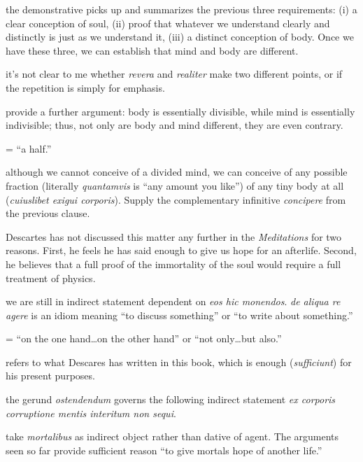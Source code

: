  the demonstrative picks up and summarizes the previous three requirements: (i) a clear conception of soul, (ii) proof that whatever we understand clearly and distinctly is just as we understand it, (iii) a distinct conception of body. Once we have these three, we can establish that mind and body are different.

 it's not clear to me whether \textit{revera} and \textit{realiter} make two different points, or if the repetition is simply for emphasis.

 provide a further argument: body is essentially divisible, while mind is essentially indivisible; thus, not only are body and mind different, they are even contrary.

 = ``a half.''

 although we cannot conceive of a divided mind, we can conceive of any possible fraction (literally \textit{quantamvis} is ``any amount you like'') of any tiny body at all (\textit{cuiuslibet exigui corporis}). Supply the complementary infinitive \textit{concipere} from the previous clause.

 Descartes has not discussed this matter any further in the \textit{Meditations} for two reasons. First, he feels he has said enough to give us hope for an afterlife. Second, he believes that a full proof of the immortality of the soul would require a full treatment of physics.

 we are still in indirect statement dependent on \textit{eos hic monendos}. \textit{de aliqua re agere} is an idiom meaning ``to discuss something'' or ``to write about something.''

 = ``on the one hand\dots on the other hand'' or ``not only\dots but also.'' 

 refers to what Descares has written in this book, which is enough (\textit{sufficiunt}) for his present purposes.

 the gerund \textit{ostendendum} governs the following indirect statement \textit{ex corporis corruptione mentis interitum non sequi}.

 take \textit{mortalibus} as indirect object rather than dative of agent. The arguments seen so far provide sufficient reason ``to give mortals hope of another life.''

